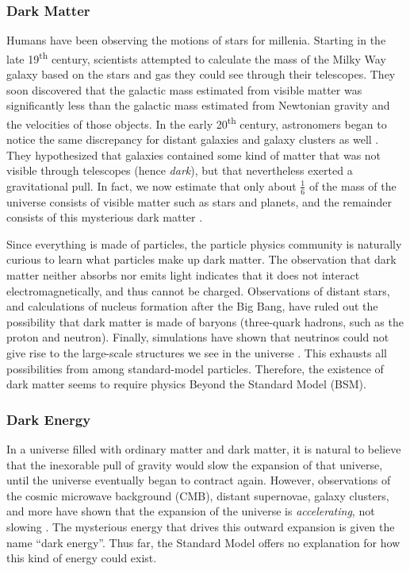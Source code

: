\subsubsection*{Dark Matter}
Humans have been observing the motions of stars
for millenia. Starting in the late 19\textsuperscript{th}
century, scientists attempted to calculate the mass of the Milky Way
galaxy based on the stars and gas they could see through their
telescopes. They soon discovered that the galactic mass estimated from
visible matter was significantly less than the galactic mass
estimated from Newtonian gravity and the velocities of those objects. In the early
20\textsuperscript{th} century, astronomers began to notice the same
discrepancy for distant galaxies and galaxy clusters as well \cite{dmhistory}.
They hypothesized that galaxies contained some kind of
matter that was not visible through telescopes (hence \emph{dark}),
but that nevertheless exerted a gravitational pull.
In fact, we now estimate that only about $\frac{1}{6}$ of the
mass of the universe consists of visible matter such as stars
and planets, and the remainder consists of this mysterious dark matter
\cite{planck2013}.

Since everything is made of particles, the particle physics community
is naturally curious to learn what particles make up dark matter.
The observation that dark matter neither absorbs nor emits light
indicates that it does not interact electromagnetically, and thus
cannot be charged. Observations of distant stars, and calculations of
nucleus formation after the Big Bang, have ruled out the possibility
that dark matter is made of baryons (three-quark hadrons,
such as the proton and neutron). Finally, simulations have shown
that neutrinos could not give rise to the large-scale structures
we see in the universe \cite{dmhistory}.
This exhausts all possibilities from among standard-model particles.
Therefore, the existence of dark matter seems to require
physics Beyond the Standard Model (BSM).

\subsubsection*{Dark Energy}
In a universe filled with ordinary matter and dark matter, it is
natural to believe that the inexorable pull of gravity would
slow the expansion of that universe, until the universe eventually began to
contract again. However, observations of the cosmic microwave background
(CMB), distant supernovae, galaxy clusters, and more have shown that
the expansion of the universe is \emph{accelerating}, not slowing
\cite{darkenergy}. The mysterious energy that drives this outward expansion
is given the name ``dark energy''. Thus far, the Standard Model offers no
explanation for how this kind of energy could exist.

